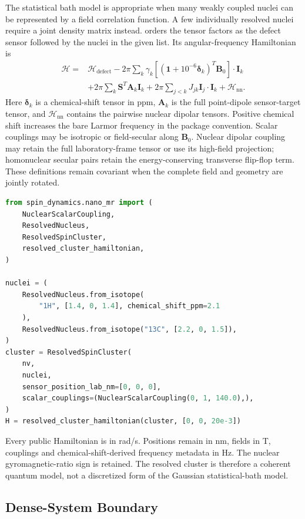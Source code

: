 The statistical bath model is appropriate when many weakly coupled nuclei can
be represented by a field correlation function. A few individually resolved
nuclei require a joint density matrix instead. 
orders the tensor factors as the defect sensor followed by the nuclei in the
given list. Its angular-frequency Hamiltonian is
\[
\begin{split}
  \mathcal H={}&\mathcal H_\mathrm{defect}
  -2\pi\sum_k\gamma_k
  \left[
    \left(\mathbf 1+10^{-6}\boldsymbol\delta_k\right)^T\mathbf B_0
  \right]\cdot\mathbf I_k \\
  &+2\pi\sum_k\mathbf S^T\mathbf A_k\mathbf I_k
  +2\pi\sum_{j<k}J_{jk}\mathbf I_j\cdot\mathbf I_k
  +\mathcal H_\mathrm{nn}.
\end{split}
\]
Here \(\boldsymbol\delta_k\) is a chemical-shift tensor in ppm,
\(\mathbf A_k\) is the full point-dipole sensor-target tensor, and
\(\mathcal H_\mathrm{nn}\) contains the pairwise nuclear dipolar tensors.
Positive chemical shift increases the bare Larmor frequency in the package
convention. Scalar couplings may be isotropic or field-secular along \(\mathbf B_0\). Nuclear dipolar coupling may retain the full laboratory-frame tensor or use its high-field projection; homonuclear secular pairs retain the energy-conserving transverse flip-flop term. These definitions remain covariant when the complete field and geometry are jointly rotated.

\begin{lstlisting}[language=Python]
from spin_dynamics.nano_mr import (
    NuclearScalarCoupling,
    ResolvedNucleus,
    ResolvedSpinCluster,
    resolved_cluster_hamiltonian,
)

nuclei = (
    ResolvedNucleus.from_isotope(
        "1H", [1.4, 0, 1.4], chemical_shift_ppm=2.1
    ),
    ResolvedNucleus.from_isotope("13C", [2.2, 0, 1.5]),
)
cluster = ResolvedSpinCluster(
    nv,
    nuclei,
    sensor_position_lab_nm=[0, 0, 0],
    scalar_couplings=(NuclearScalarCoupling(0, 1, 140.0),),
)
H = resolved_cluster_hamiltonian(cluster, [0, 0, 20e-3])
\end{lstlisting}

Every public Hamiltonian is in rad/s. Positions remain in nm, fields in T,
couplings and chemical-shift-derived frequency metadata in Hz. The nuclear
gyromagnetic-ratio sign is retained. The resolved cluster is therefore a
coherent quantum model, not a discretized form of the Gaussian statistical-bath model.

\subsection{Dense-System Boundary}

